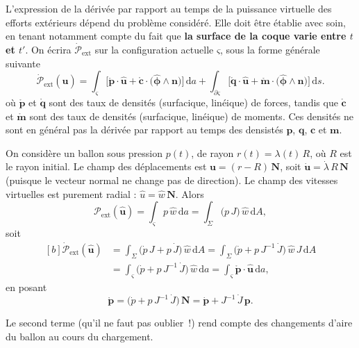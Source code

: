 \documentclass[
  a4paper,
  DIV=11,
  numbers=noendperiod]{scrreprt}
\newcommand{\D}{{\mathrm d}}
\newcommand{\external}{\mathrm{ext}}
\newcommand{\power}{\mathcal{P}}
\renewcommand{\vec}[1]{\symbf{#1}}
\begin{document}
L'expression de la dérivée par rapport au temps de la puissance
virtuelle des efforts extérieurs dépend du problème considéré. Elle doit
être établie avec soin, en tenant notamment compte du fait que
\textbf{la surface de la coque varie entre \(t\) et \(t'\)}. On écrira
\(\dot{\power}_\external\) sur la configuration actuelle \(ς\), sous la
forme générale suivante \[
\dot{\mathcal{P}}_\external(\hat{\vec{u}})=
∫_ς \bigl[ \mathring{\vec{p}} ⋅ \hat{\vec{u}} + \mathring{\vec{c}} ⋅ \bigl( \hat{\vec{ϕ}} \wedge \vec{n} \bigr) \bigr] \, \D a
+ ∫_{∂ς} \bigl[ \mathring{\vec{q}} ⋅ \hat{\vec{u}} + \mathring{\vec{m}} ⋅ \bigl( \hat{\vec{ϕ}} \wedge \vec{n} \bigr) \bigr] \, \D s.
\] où \(\mathring{\vec{p}}\) et \(\mathring{\vec{q}}\) sont des taux de
densités (surfacique, linéique) de forces, tandis que
\(\mathring{\vec{c}}\) et \(\mathring{\vec{m}}\) sont des taux de
densités (surfacique, linéique) de moments. Ces densités ne sont en
général pas la dérivée par rapport au temps des densistés \(\vec{p}\),
\(\vec{q}\), \(\vec{c}\) et \(\vec{m}\).

\begin{tcolorbox}[enhanced jigsaw, toprule=.15mm, breakable, left=2mm, rightrule=.15mm, colbacktitle=quarto-callout-note-color!10!white, colframe=quarto-callout-note-color-frame, title=\textcolor{quarto-callout-note-color}{\faInfo}\hspace{0.5em}{Exemple: ballon sphérique sous pression}, bottomtitle=1mm, arc=.35mm, coltitle=black, opacityback=0, leftrule=.75mm, titlerule=0mm, toptitle=1mm, bottomrule=.15mm, opacitybacktitle=0.6, colback=white]

On considère un ballon sous pression \(p(t)\), de rayon
\(r(t) = λ(t) \, R\), où \(R\) est le rayon initial. Le champ des
déplacements est \(\vec{u} = (r - R) \, \vec{N}\), soit
\(\dot{\vec{u}} = \dot{λ} \, R \, \vec{N}\) (puisque le vecteur normal
ne change pas de direction). Le champ des vitesses virtuelles est
purement radial : \(\hat{u} = \hat{w} \, \vec{N}\). Alors \[
\power_\external(\hat{\vec{u}}) = ∫_ς p \, \hat{w} \, \D a = ∫_Σ \bigl( p \, J \bigr) \, \hat{w} \, \D A,
\] soit \[
\begin{aligned}[b]
\dot{\power}_\external(\hat{\vec{u}}) &= ∫_Σ \bigl( \dot{p} \, J + p \, \dot{J} \bigr) \, \hat{w} \, \D A = ∫_Σ \bigl(\dot{p} + p \, J^{-1} \, \dot{J} \bigr) \, \hat{w} \, J \, \D A\\
&= ∫_ς \bigl(\dot{p} + p \, J^{-1} \, \dot{J} \bigr) \, \hat{w} \, \D a = ∫_ς \mathring{\vec{p}} ⋅ \hat{\vec{u}} \, \D a,
\end{aligned}
\] en posant \[
\mathring{\vec{p}} = \bigl(\dot{p} + p \, J^{-1} \, \dot{J} \bigr) \, \vec{N} = \dot{\vec{p}} + J^{-1} \, \dot{J} \, \vec{p}.
\]

Le second terme (qu'il ne faut pas oublier~!) rend compte des
changements d'aire du ballon au cours du chargement.

\end{tcolorbox}
\end{document}
